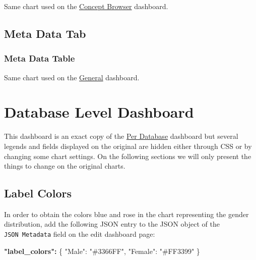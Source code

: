 \documentclass[
]{book}
\newenvironment{Shaded}{\begin{snugshade}}{\end{snugshade}}
\newcommand{\DataTypeTok}[1]{\textcolor[rgb]{0.13,0.29,0.53}{#1}}
\newcommand{\ErrorTok}[1]{\textcolor[rgb]{0.64,0.00,0.00}{\textbf{#1}}}
\newcommand{\FunctionTok}[1]{\textcolor[rgb]{0.00,0.00,0.00}{#1}}
\newcommand{\StringTok}[1]{\textcolor[rgb]{0.31,0.60,0.02}{#1}}
\begin{document}
Same chart used on the \protect\hyperlink{conceptBrowserTable}{Concept Browser} dashboard.

\hypertarget{meta-data-tab}{%
\subsection*{Meta Data Tab}\label{meta-data-tab}}

\hypertarget{meta-data-table}{%
\subsubsection*{Meta Data Table}\label{meta-data-table}}

Same chart used on the \protect\hyperlink{metaDataTable}{General} dashboard.

\hypertarget{database-level-dashboard}{%
\section{Database Level Dashboard}\label{database-level-dashboard}}

This dashboard is an exact copy of the \protect\hyperlink{PerDatabaseDashboard}{Per Database} dashboard but several legends and fields
displayed on the original are hidden either through CSS or by changing some chart settings.
On the following sections we will only present the things to change on the original charts.

\hypertarget{label-colors-1}{%
\subsection*{Label Colors}\label{label-colors-1}}

In order to obtain the colors blue and rose in the chart representing the gender distribution,
add the following JSON entry to the JSON object of the \texttt{JSON\ Metadata} field on the edit dashboard page:

\begin{Shaded}
\begin{Highlighting}[]
\ErrorTok{"label\_colors":} \FunctionTok{\{}
    \DataTypeTok{"Male"}\FunctionTok{:} \StringTok{"\#3366FF"}\FunctionTok{,}
    \DataTypeTok{"Female"}\FunctionTok{:} \StringTok{"\#FF3399"}
\FunctionTok{\}}
\end{Highlighting}
\end{Shaded}
\end{document}
